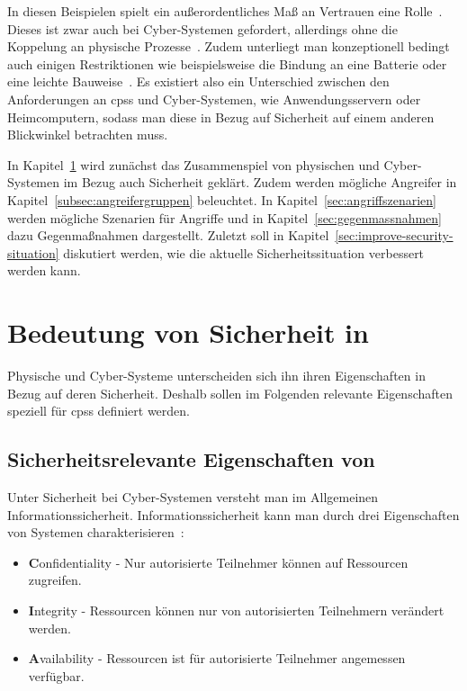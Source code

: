 \documentclass[final,bibliography=totocnumbered]{include/sikseminar}
\newcommand{\fb}[1]{\dofb#1}
\newcommand{\cps}{\glspl{cps}\xspace}
\newcommand{\dofb}[1]{\textbf{#1}\nobreak\hspace{0pt}}
\begin{document}
    In diesen Beispielen spielt ein außerordentliches Maß an Vertrauen eine Rolle~\cite{SGL+08}.
    Dieses ist zwar auch bei Cyber-Systemen gefordert, allerdings ohne die Koppelung an physische Prozesse~\cite{BG11}.
    Zudem unterliegt man konzeptionell bedingt auch einigen Restriktionen wie beispielsweise die Bindung an eine Batterie oder eine leichte Bauweise~\cite{YWY+17}.
    Es existiert also ein Unterschied zwischen den Anforderungen an \cps und Cyber-Systemen, wie Anwendungsservern oder Heimcomputern, sodass man diese in Bezug auf Sicherheit auf einem anderen Blickwinkel betrachten muss.

    In Kapitel~\ref{sec:bedeutung-sicherheit} wird zunächst das Zusammenspiel von physischen und Cyber-Systemen im Bezug auch Sicherheit geklärt.
    Zudem werden mögliche Angreifer in Kapitel~\ref{subsec:angreifergruppen} beleuchtet.
    In Kapitel~\ref{sec:angriffszenarien} werden mögliche Szenarien für Angriffe und in Kapitel~\ref{sec:gegenmassnahmen} dazu Gegenmaßnahmen dargestellt.
    Zuletzt soll in Kapitel~\ref{sec:improve-security-situation} diskutiert werden, wie die aktuelle Sicherheitssituation verbessert werden kann.

    \section{Bedeutung von Sicherheit in }
    \label{sec:bedeutung-sicherheit}

    Physische und Cyber-Systeme unterscheiden sich ihn ihren Eigenschaften in Bezug auf deren Sicherheit.
    Deshalb sollen im Folgenden relevante Eigenschaften speziell für \cps definiert werden.

    \subsection{Sicherheitsrelevante Eigenschaften von }
    \label{subsec:definition}
    Unter Sicherheit bei Cyber-Systemen versteht man im Allgemeinen Informationssicherheit.
    Informationssicherheit kann man durch drei Eigenschaften von Systemen charakterisieren~\cite{CH13}:
    \begin{itemize}[noitemsep,wide=0pt]
        \item \fb{Confidentiality} - Nur autorisierte Teilnehmer können auf Ressourcen zugreifen.
        \item \fb{Integrity} - Ressourcen können nur von autorisierten Teilnehmern verändert werden.
        \item \fb{Availability} - Ressourcen ist für autorisierte Teilnehmer angemessen verfügbar.
    \end{itemize}
\end{document}
